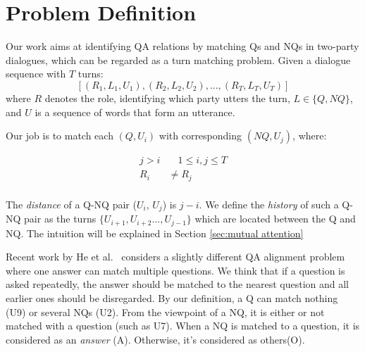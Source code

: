\section{Problem Definition}
\label{sec:problem}
Our work aims at identifying QA relations by matching Qs and NQs in two-party dialogues, which can be regarded as a turn matching problem. Given a dialogue sequence with $T$ turns: 
$$[(R_1,L_1,U_1),(R_2,L_2,U_2),...,(R_T,L_T,U_T)]$$ 
where $R$ denotes the role, identifying which party utters
the turn, $L\in\{Q, NQ\}$, and $U$ is a sequence of words that form an utterance. 

Our job is to match each $(Q, U_i)$ with corresponding $(NQ, U_j)$, where:

\begin{equation}
\begin{aligned}
j>i&\quad 1\leq i,j\leq T\\
R_i&\not=R_j\\
\end{aligned}
\end{equation}

The {\em distance} of a Q-NQ pair ($U_i$, $U_j$) is $j-i$. We define
the {\em history} of such a Q-NQ pair as the turns 
$\{U_{i+1},U_{i+2}...,U_{j-1}\}$ which are located between the Q and NQ. The intuition will be explained in Section \ref{sec:mutual attention}

Recent work by He et al.~ considers a slightly different 
QA alignment problem where one answer can match multiple questions. 
We think that if a question is asked repeatedly, the answer should be matched to 
the nearest question and all earlier ones should be disregarded. 
By our definition, a Q can match nothing (U9) or several NQs (U2). From the viewpoint of a NQ, it is either or not matched with a question (such as U7). When a NQ is matched to a question, it is 
considered as an {\em answer} (A). Otherwise, it's considered as others(O).



